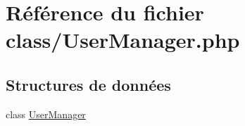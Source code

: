 \hypertarget{_user_manager_8php}{}\section{Référence du fichier class/\+User\+Manager.php}
\label{_user_manager_8php}
\subsection*{Structures de données}
\begin{DoxyCompactItemize}
\item 
class \mbox{\hyperlink{class_user_manager}{User\+Manager}}
\end{DoxyCompactItemize}
